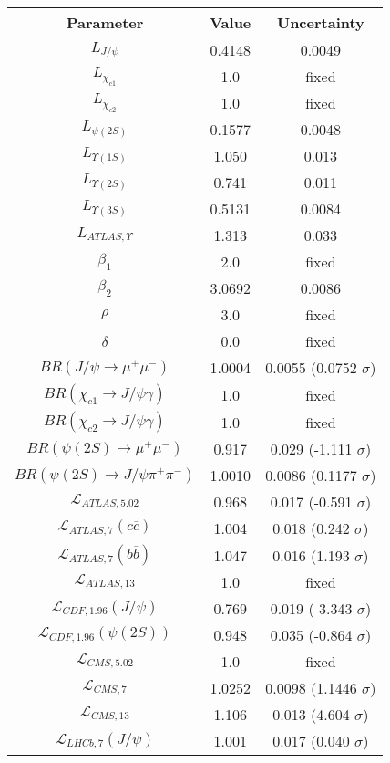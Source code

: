 \begin{table}[h!]
\centering
\begin{tabular}{c|c|c}
Parameter & Value & Uncertainty \\
\hline
$L_{J/\psi}$ & 0.4148 & 0.0049 \\
$L_{\chi_{c1}}$ & 1.0 & fixed \\
$L_{\chi_{c2}}$ & 1.0 & fixed \\
$L_{\psi(2S)}$ & 0.1577 & 0.0048 \\
$L_{\Upsilon(1S)}$ & 1.050 & 0.013 \\
$L_{\Upsilon(2S)}$ & 0.741 & 0.011 \\
$L_{\Upsilon(3S)}$ & 0.5131 & 0.0084 \\
$L_{ATLAS,\Upsilon}$ & 1.313 & 0.033 \\
$\beta_1$ & 2.0 & fixed \\
$\beta_2$ & 3.0692 & 0.0086 \\
$\rho$ & 3.0 & fixed \\
$\delta$ & 0.0 & fixed \\
$BR(J/\psi\rightarrow\mu^+\mu^-)$ & 1.0004 & 0.0055 (0.0752 $\sigma$) \\
$BR(\chi_{c1}\rightarrow J/\psi\gamma)$ & 1.0 & fixed \\
$BR(\chi_{c2}\rightarrow J/\psi\gamma)$ & 1.0 & fixed \\
$BR(\psi(2S)\rightarrow\mu^+\mu^-)$ & 0.917 & 0.029 (-1.111 $\sigma$) \\
$BR(\psi(2S)\rightarrow J/\psi\pi^+\pi^-)$ & 1.0010 & 0.0086 (0.1177 $\sigma$) \\
$\mathcal L_{ATLAS,5.02}$ & 0.968 & 0.017 (-0.591 $\sigma$) \\
$\mathcal L_{ATLAS,7}(c\overline c)$ & 1.004 & 0.018 (0.242 $\sigma$) \\
$\mathcal L_{ATLAS,7}(b\overline b)$ & 1.047 & 0.016 (1.193 $\sigma$) \\
$\mathcal L_{ATLAS,13}$ & 1.0 & fixed \\
$\mathcal L_{CDF,1.96}(J/\psi)$ & 0.769 & 0.019 (-3.343 $\sigma$) \\
$\mathcal L_{CDF,1.96}(\psi(2S))$ & 0.948 & 0.035 (-0.864 $\sigma$) \\
$\mathcal L_{CMS,5.02}$ & 1.0 & fixed \\
$\mathcal L_{CMS,7}$ & 1.0252 & 0.0098 (1.1446 $\sigma$) \\
$\mathcal L_{CMS,13}$ & 1.106 & 0.013 (4.604 $\sigma$) \\
$\mathcal L_{LHCb,7}(J/\psi)$ & 1.001 & 0.017 (0.040 $\sigma$) \\

\end{tabular}
\end{table}
